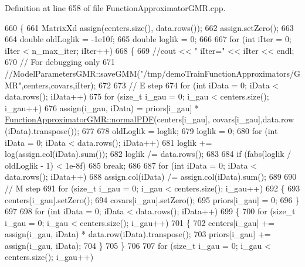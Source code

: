 Definition at line 658 of file Function\+Approximator\+G\+M\+R.\+cpp.


\begin{DoxyCode}
660 \{
661   MatrixXd assign(centers.size(), data.rows());
662   assign.setZero();
663 
664   \textcolor{keywordtype}{double} oldLoglik = -1e10f;
665   \textcolor{keywordtype}{double} loglik = 0;
666 
667   \textcolor{keywordflow}{for} (\textcolor{keywordtype}{int} iIter = 0; iIter < n\_max\_iter; iIter++)
668   \{
669     \textcolor{comment}{//cout << "  iIter=" << iIter << endl;}
670     \textcolor{comment}{// For debugging only}
671     \textcolor{comment}{//ModelParametersGMR::saveGMM("/tmp/demoTrainFunctionApproximators/GMR",centers,covars,iIter);}
672     
673     \textcolor{comment}{// E step}
674     \textcolor{keywordflow}{for} (\textcolor{keywordtype}{int} iData = 0; iData < data.rows(); iData++)
675       \textcolor{keywordflow}{for} (\textcolor{keywordtype}{size\_t} i\_gau = 0; i\_gau < centers.size(); i\_gau++)
676         assign(i\_gau, iData) = priors[i\_gau] * 
      \hyperlink{classDmpBbo_1_1FunctionApproximatorGMR_a68ed18ca86526a591014123290dc855a}{FunctionApproximatorGMR::normalPDF}(centers[i\_gau], covars[i\_gau],data.row
      (iData).transpose());
677 
678     oldLoglik = loglik;
679     loglik = 0;
680     \textcolor{keywordflow}{for} (\textcolor{keywordtype}{int} iData = 0; iData < data.rows(); iData++)
681       loglik += log(assign.col(iData).sum());
682     loglik /= data.rows();
683 
684     \textcolor{keywordflow}{if} (fabs(loglik / oldLoglik - 1) < 1e-8f)
685       \textcolor{keywordflow}{break};
686 
687     \textcolor{keywordflow}{for} (\textcolor{keywordtype}{int} iData = 0; iData < data.rows(); iData++)
688       assign.col(iData) /= assign.col(iData).sum();
689 
690     \textcolor{comment}{// M step}
691     \textcolor{keywordflow}{for} (\textcolor{keywordtype}{size\_t} i\_gau = 0; i\_gau < centers.size(); i\_gau++)
692     \{
693       centers[i\_gau].setZero();
694       covars[i\_gau].setZero();
695       priors[i\_gau] = 0;
696     \}
697 
698     \textcolor{keywordflow}{for} (\textcolor{keywordtype}{int} iData = 0; iData < data.rows(); iData++)
699     \{
700       \textcolor{keywordflow}{for} (\textcolor{keywordtype}{size\_t} i\_gau = 0; i\_gau < centers.size(); i\_gau++)
701       \{
702         centers[i\_gau] += assign(i\_gau, iData) * data.row(iData).transpose();
703         priors[i\_gau] += assign(i\_gau, iData);
704       \}
705     \}
706 
707     \textcolor{keywordflow}{for} (\textcolor{keywordtype}{size\_t} i\_gau = 0; i\_gau < centers.size(); i\_gau++)

\end{DoxyCode}
